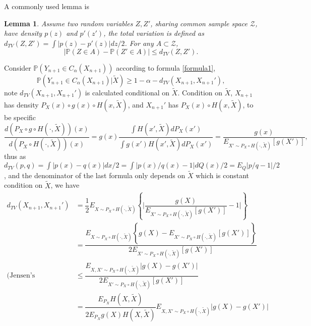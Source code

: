 \documentclass[12pt, a4paper, oneside]{article}
\newtheorem{lemma}[theorem]{Lemma}
\begin{document}
    A commonly used lemma is
    \begin{lemma}
        Assume two random variables $Z,Z'$, sharing common sample space $\mathcal{Z}$, have density $p(z)$ and $p'(z')$, the total variation is defined as $d_{TV}(Z,Z')=\int |p(z)-p'(z)|dz/2$. For any $A\subset \mathcal{Z}$,
        \begin{equation*}
            \Big|\mathbb{P}(Z\in A)-\mathbb{P}(Z'\in A)\Big|\leq d_{TV}(Z,Z').
        \end{equation*}
    \end{lemma}


    Consider $\mathbb{P}\left( Y_{n+1}\in C_\alpha(X_{n+1}) \right)$ according to formula \ref{formula1},
    \begin{equation*}
        \mathbb{P}\left( Y_{n+1}\in C_\alpha(X_{n+1})\Big|\tilde{X} \right)\geq 1-\alpha-d_{TV}(X_{n+1},X_{n+1}'),
    \end{equation*}
    note $d_{TV}(X_{n+1},X_{n+1}')$ is calculated conditional on $\tilde{X}$. Condition on $\tilde{X}$, $X_{n+1}$ has density $P_X(x)\circ g(x)\circ H(x,\tilde{X})$, and $X_{n+1}'$ has $P_X(x)\circ H(x,\tilde{X})$, to be specific
    \begin{equation*}
        \dfrac{d(P_X\circ g\circ H(\cdot,\tilde{X}))(x)}{d(P_X\circ H(\cdot,\tilde{X}))(x)}=g(x)\dfrac{\int H(x',\tilde{X})dP_X(x')}{\int g(x')H(x',\tilde{X})dP_X(x')}=\dfrac{g(x)}{E_{X'\sim P_X\circ H(\cdot,\tilde{X})}\left[ g(X') \right]},
    \end{equation*}
    thus as $d_{TV}(p,q)=\int|p(x)-q(x)|dx/2=\int|p(x)/q(x)-1|dQ(x)/2=E_Q|p/q-1|/2$, and the denominator of the last formula only depends on $\tilde{X}$ which is constant condition on $\tilde{X}$, we have
    \begin{align*}
        d_{TV}(X_{n+1},X_{n+1}')&=\dfrac{1}{2}E_{X\sim P_X\circ H(\cdot,\tilde{X})}\left\{ \Big|\dfrac{g(X)}{E_{X'\sim P_X\circ H(\cdot,\tilde{X})}\left[ g(X') \right]}-1\Big| \right\}\\
        &=\dfrac{E_{X\sim P_X\circ H(\cdot,\tilde{X})}\left\{ g(X)-E_{X'\sim P_X\circ H(\cdot,\tilde{X})}\left[ g(X') \right] \right\}}{2E_{X'\sim P_X\circ H(\cdot,\tilde{X})}\left[ g(X') \right]}\\
        \text{(Jensen's Inequality)}&\leq\dfrac{E_{X,X'\sim P_X\circ H(\cdot,\tilde{X})}\Big|g(X)-g(X')\Big|}{2E_{X'\sim P_X\circ H(\cdot,\tilde{X})}\left[ g(X') \right]}\\
        &=\dfrac{E_{P_X}H(X,\tilde{X})}{2E_{P_X}g(X)H(X,\tilde{X})}E_{X,X'\sim P_X\circ H(\cdot,\tilde{X})}\Big|g(X)-g(X')\Big|
    \end{align*}
\end{document}
